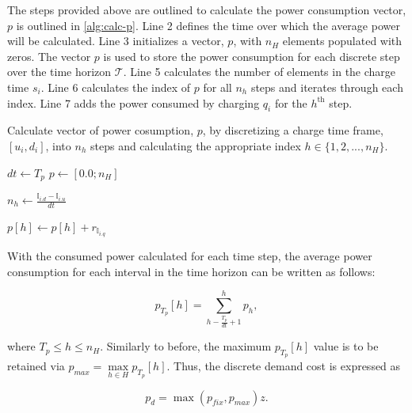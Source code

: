 \documentclass[11pt,a4paper,final]{article}
\newcommand{\T}{\mathcal{T}}                %
\newcommand{\I}{\mathbb{I}}                 %
\begin{document}
The steps provided above are outlined to calculate the power consumption vector, \(p\) is outlined in \ref{alg:calc-p}.
Line 2 defines the time over which the average power will be calculated. Line 3 initializes a vector, \(p\), with \(n_H\)
elements populated with zeros. The vector \(p\) is used to store the power consumption for each discrete step over the
time horizon \(\T\). Line 5 calculates the number of elements in the charge time \(s_i\). Line 6 calculates the index of \(p\)
for all \(n_h\) steps and iterates through each index. Line 7 adds the power consumed by charging \(q_i\) for the
\(h^{\text{th}}\) step.

\begin{algorithm}[H]
  \scriptsize
  \caption{Calculate vector of power cosumption, $p$, by discretizing a charge time frame, $[u_i, d_i]$, into $n_h$ steps and calculating the appropriate index $h \in \{1,2,...,n_H\}$.} \label{alg:calc-p}
  \LinesNumbered
  \KwIn{$(\I, r)$}

  \Begin
    {
      $dt \leftarrow T_p$
      $p \leftarrow [0.0; n_H]$

      \ForEach {$\I_i \in \I$}
      {
        $n_h \leftarrow \frac{\I_{i.d} - \I_{i.u}}{dt}$

        {
          $p[h] \leftarrow p[h] + r_{\I_{i.q}}$
        }
      }
    }
\end{algorithm}

With the consumed power calculated for each time step, the average power consumption for each interval in the time
horizon can be written as follows:

\begin{equation}
p_{T_p}[h] = \sum_{h-\frac{T_p}{dt}+1}^h p_h,
\end{equation}

where \(T_p \le h \le n_H\). Similarly to before, the maximum \(p_{T_p}[h]\) value is to be retained via \(p_{max} =
\max\limits_{h \in H}p_{T_p}[h]\). Thus, the discrete demand cost is expressed as

\begin{equation}
\label{eq:pd-dis}
  p_d = \max(p_{fix}, p_{max})z\text{.}
\end{equation}
\end{document}
